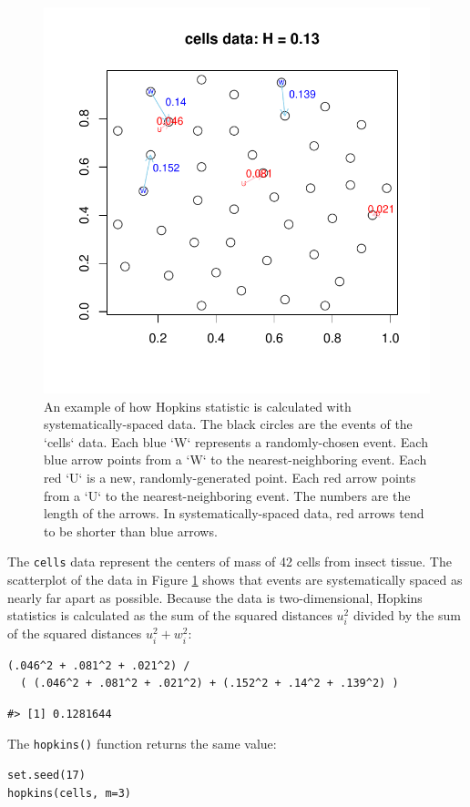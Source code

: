 \begin{figure}

{\centering \includegraphics[width=0.6\linewidth]{RJ-2022-055_files/figure-latex/cells-1} 

}

\caption{An example of how Hopkins statistic is calculated with systematically-spaced data. The black circles are the events of the `cells` data. Each blue `W` represents a randomly-chosen event. Each blue arrow points from a `W` to the nearest-neighboring event. Each red `U` is a new, randomly-generated point. Each red arrow points from a `U` to the nearest-neighboring event. The numbers are the length of the arrows. In systematically-spaced data, red arrows tend to be shorter than blue arrows.}\label{fig:cells}
\end{figure}

The \texttt{cells} data represent the centers of mass of 42 cells from insect tissue. The scatterplot of the data in Figure \ref{fig:cells} shows that events are systematically spaced as nearly far apart as possible. Because the data is two-dimensional, Hopkins statistics is calculated as the sum of the squared distances \(u_i^2\) divided by the sum of the squared distances \(u_i^2 + w_i^2\):

\begin{verbatim}
(.046^2 + .081^2 + .021^2) / 
  ( (.046^2 + .081^2 + .021^2) + (.152^2 + .14^2 + .139^2) )
\end{verbatim}

\begin{verbatim}
#> [1] 0.1281644
\end{verbatim}

The \texttt{hopkins()} function returns the same value:

\begin{verbatim}
set.seed(17)
hopkins(cells, m=3)
\end{verbatim}

